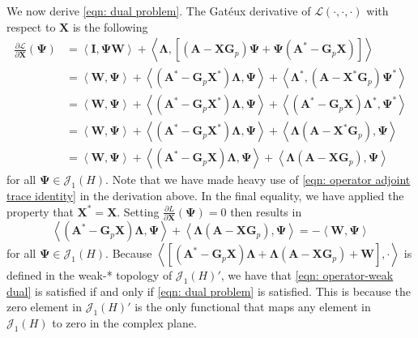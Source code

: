 \documentclass{amsart}
\newcommand{\sJ}{\mathscr J}
\newcommand{\p}[1]{\left( {#1} \right)}
\newcommand{\br}[1]{\left[ #1 \right]}
\newcommand{\dual}[1]{\left< #1 \right>}
\newcommand{\bA}{\mathbf A}
\newcommand{\bX}{\mathbf X}
\newcommand{\bG}{\mathbf G}
\newcommand{\bI}{\mathbf I}
\newcommand{\bLambda}{\boldsymbol{\Lambda}}
\newcommand{\bPsi}{\boldsymbol{\Psi}}
\newcommand{\bW}{\mathbf W}
\begin{document}
We now derive \eqref{eqn: dual problem}. The Gat\'eux derivative of $\mathcal L(\cdot, \cdot, \cdot)$ with respect to $\bX$ is the following
$$
\begin{aligned}
    \frac{\partial\mathcal L}{\partial \bX}(\bPsi) &=
    \dual{\bI, \bPsi\bW} +
    \dual{\bLambda, \br{ \p{\bA  - \bX \bG_p}\bPsi + \bPsi \p{ \bA^* - \bG_p\bX}}} \\
    &= \dual{\bW, \bPsi} 
        + \dual{\p{\bA^* - \bG_p \bX^*}\bLambda, \bPsi}
        + \dual{\bLambda^*, (\bA-\bX^*\bG_p)\bPsi^*} \\
    &= \dual{\bW, \bPsi} 
        + \dual{\p{\bA^* - \bG_p \bX^*}\bLambda, \bPsi}
        + \dual{(\bA^*-\bG_p\bX)\bLambda^*, \bPsi^*} \\
   &= \dual{\bW, \bPsi} 
        + \dual{\p{\bA^* - \bG_p \bX^*}\bLambda, \bPsi}
        + \dual{\bLambda \p{\bA-\bX^*\bG_p}, \bPsi} \\
   &= \dual{\bW, \bPsi} 
        + \dual{\p{\bA^* - \bG_p \bX}\bLambda, \bPsi}
        + \dual{\bLambda \p{\bA-\bX\bG_p}, \bPsi}
\end{aligned}
$$
for all $\bPsi \in \sJ_1(H)$. Note that we have made heavy use of \eqref{eqn: operator adjoint trace identity} in the derivation above. In the final equality, we have applied the property that $\bX^* = \bX$. Setting $\frac{\partial L}{\partial \bX}(\bPsi) = 0$ then results in 
\begin{equation}
\label{eqn: operator-weak dual}
\dual{\p{\bA^* - \bG_p \bX}\bLambda, \bPsi}
        + \dual{\bLambda \p{\bA-\bX\bG_p}, \bPsi}
    = -\dual{\bW, \bPsi}        
\end{equation}
for all $\bPsi \in \sJ_1(H)$. Because $\dual{\br{\p{\bA^*-\bG_p\bX}\bLambda + \bLambda\p{\bA - \bX\bG_p} + \bW},\cdot}$ is defined in the weak-* topology of $\sJ_1(H)'$, we have that \eqref{eqn: operator-weak dual} is satisfied if and only if \eqref{eqn: dual problem} is satisfied. This is because the zero element in $\sJ_1(H)'$ is the only functional that maps any element in $\sJ_1(H)$ to zero in the complex plane. 
\end{document}
